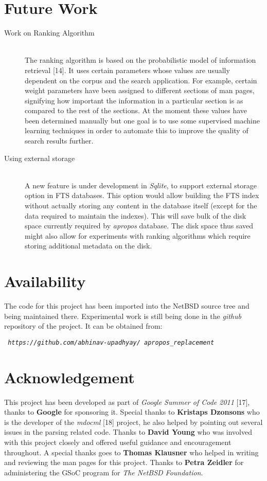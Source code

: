\documentclass[letterpaper,twocolumn,10pt]{article}
\begin{document}
\section{Future Work}
\begin{description}
\item[Work on Ranking Algorithm] \hfill \\
The ranking algorithm is based on the probabilistic model of information
retrieval [14]. It
uses certain parameters whose values are usually dependent on the corpus and the
search application. For example, certain weight parameters have been assigned to
different sections of man pages, signifying how important the information in a
particular section is as compared to the rest of the sections. At the moment
these values have been determined
manually but one goal is to use some supervised machine learning techniques in
order to automate this to improve the quality of search results further.
\end{description}

\begin{description}
\item[Using external storage] \hfill \\
A new feature is under development in \textit{Sqlite}, to support external
storage option in FTS databases. This option would allow building the FTS
index without actually storing any content in the database itself (except for
the data required to maintain the indexes). This will save bulk of the disk
space currently required by \textit{apropos} database. The disk space thus
saved might also allow for experiments with ranking algorithms which require
storing additional metadata on the disk.
\end{description}

\section{Availability}
The code for this project has been imported into the NetBSD source tree and
being maintained there. Experimental work is still being done in the \textit
{github} repository of the project. It can be obtained from:\newline

{\tt
 \emph{https://github.com/abhinav-upadhyay/
 apropos\_replacement}
}


\section{Acknowledgement}
This project has been developed as part of \emph{Google Summer of Code 2011}
[17], thanks to \textbf{Google} for sponsoring it. Special thanks to
\textbf{Kristaps Dzonsons} who is the developer of the \textit{mdocml} [18]
project, he also helped by pointing out several issues in the parsing related
code. Thanks to \textbf{David Young} who was involved with
this project closely and offered useful guidance and encouragement throughout. A
special thanks goes to \textbf{Thomas Klausner} who helped in writing and
reviewing the man pages for this project. Thanks to \textbf{Petra Zeidler} for
administering the GSoC program for \textit{The NetBSD Foundation}. \\
\end{document}
